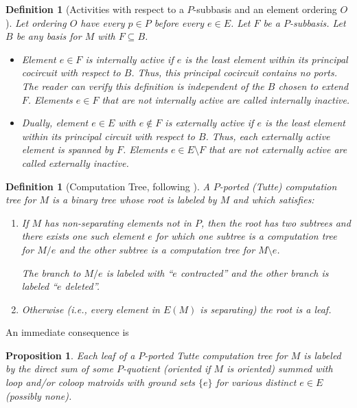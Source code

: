 \documentclass[12pt,leqno]{amsart}
\newtheorem{prop}[lem]{Proposition}
\newtheorem{definition}[lem]{Definition}
\theoremstyle{remark}
\begin{document}
\begin{definition}[Activities with respect to a $P$-subbasis and an element
ordering $O$]
\label{Activities-Ordered-Def}
Let ordering $O$ have every $p\in P$ before every
$e\in E$.  Let $F$ be a $P$-subbasis.  Let $B$ be any basis for 
$M$ with $F\subseteq B$.
\begin{itemize}
\item Element $e\in F$
is internally active if $e$ is the least element
within its principal cocircuit with respect to $B$.  Thus, this principal
cocircuit contains no ports.  The reader can verify this definition is 
independent of the $B$ chosen to extend $F$.  Elements $e\in F$ that are
not internally active are called internally inactive.
\item Dually, element $e\in E$ with $e\not\in F$ is externally 
active if $e$ is the least element within its principal circuit with
respect to $B$.  Thus, each externally active element is spanned by 
$F$.  Elements $e\in E\setminus F$ that are not externally active
are called externally inactive.
\end{itemize}
\end{definition}

\begin{definition}[Computation Tree, following \cite{GordonMcMachonGreedoid}]
\label{CompTreeDef}
A $P$-ported (Tutte) computation tree for $M$ is a
binary tree whose root is labeled by $M$ and which satisfies:
\begin{enumerate}
\item If $M$ has non-separating elements not in $P$, then 
the root has two subtrees and there exists one such element $e$ for which 
one subtree is a computation tree
for $M/e$ and the other subtree is a computation tree for 
$M\setminus e$.

The branch to $M/e$ is labeled with ``$e$ contracted'' and 
the other branch is labeled ``$e$ deleted''.
\item Otherwise (i.e., every element in $E(M)$
is separating) the root is a leaf.
\end{enumerate}
\end{definition}

An immediate consequence is
\begin{prop}
Each leaf of a $P$-ported Tutte computation tree for $M$
is labeled by the direct sum of some $P$-quotient
(oriented if $M$ is oriented) 
summed with loop and/or coloop matroids with 
ground sets $\{e\}$ for various distinct $e\in E$ (possibly none).
\end{prop}
\end{document}
